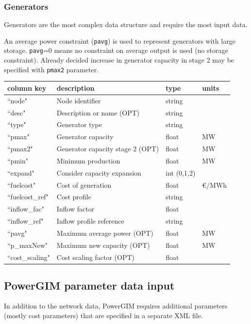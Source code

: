 \documentclass{article}
\begin{document}
\subsubsection{Generators}
Generators are the most complex data structure and require the most input data.

An average power constraint (\texttt{pavg}) is used to represent generators with large storage.
\texttt{pavg}=0 means no constraint on average output is used (no storage constraint). 
Already decided increase in generator capacity in stage 2 may be specified with \texttt{pmax2} parameter. 


\medskip
\begin{tabular}{llll}
	\hline
	 column key & description & type & units \\
	\hline
	``node"			& Node identifier 		& string	& \\
	``desc"			& Description or name (OPT)	& string	& \\
	``type"			& Generator type		& string	& \\
	``pmax"			& Generator capacity 	& float	& MW \\
	``pmax2"			& Generator capacity stage 2 (OPT) 	& float	& MW \\
	``pmin"			& Minimum production	& float	& MW \\
	``expand"			& Consider capacity expansion & int (0,1,2)		& \\
	``fuelcost"		& Cost of generation		& float	& €/MWh \\
	``fuelcost\_ref"	& Cost profile		& string \\
	``inflow\_fac"	& Inflow factor			& float	&  \\
	``inflow\_ref"		& Inflow profile reference	& string & \\
	``pavg"			& Maximum average power (OPT)		& float	& MW \\
	``p\_maxNew"	& Maximum new capacity (OPT)		& float	& MW \\	
	``cost\_scaling"	& Cost scaling factor (OPT) & float	&  \\
	\hline
\end{tabular}

\subsection{PowerGIM parameter data input}
In addition to the network data, PowerGIM requires additional parameters (mostly cost parameters) that are specified in a separate XML file.
\end{document}
